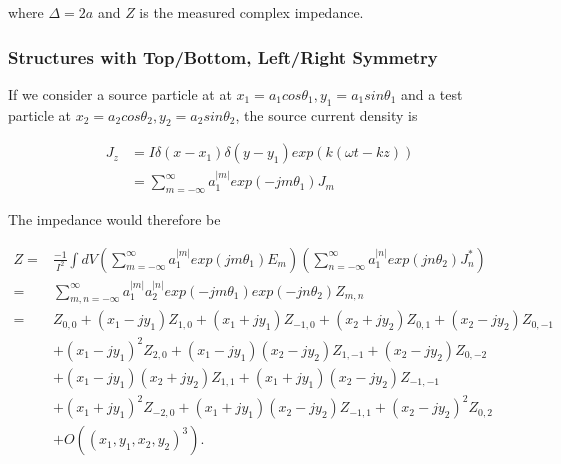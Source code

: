 \documentclass[12pt,a4paper,twopage,openright]{article}
\begin{document}
where $\Delta = 2a$ and $Z$ is the measured complex impedance.

\subsubsection{Structures with Top/Bottom, Left/Right Symmetry}

If we consider a source particle at at $x_{1} = a_{1}cos\theta_{1}, y_{1} = a_{1}sin\theta_{1}$ and a test particle at $x_{2} = a_{2}cos\theta_{2}, y_{2} = a_{2}sin\theta_{2}$, the source current density is

\begin{align}
J_{z} &= I\delta \left( x-x_{1} \right) \delta \left( y-y_{1} \right) exp \left( k \left( \omega t - kz \right) \right) \nonumber \\
          &=\displaystyle\sum\limits_{m=-\infty}^{\infty}a_{1}^{|m|}exp\left( -jm\theta_{1} \right) J_{m}
\end{align}

The impedance would therefore be

\begin{align}
Z = &\frac{-1}{I^{2}} \int dV \left( \displaystyle\sum\limits^{\infty}_{m=-\infty} a_{1}^{|m|} exp \left( jm\theta_{1} \right) E_{m}\right) \left( \displaystyle\sum\limits^{\infty}_{n=-\infty} a_{1}^{|n|} exp \left( jn\theta_{2} \right) J^{*}_{n}\right) \nonumber \\
   = &\displaystyle\sum\limits^{\infty}_{m,n=-\infty} a_{1}^{|m|} a_{2}^{|n|} exp\left( -jm\theta_{1} \right) exp\left( -jn\theta_{2} \right) Z_{m,n} \nonumber \\
   = &Z_{0,0} + \left( x_{1}- jy_{1} \right)Z_{1,0} + \left( x_{1} + jy_{1} \right)Z_{-1,0} + \left( x_{2} + jy_{2} \right)Z_{0,1} +  \left( x_{2} - jy_{2} \right)Z_{0,-1} \nonumber \\
      & +\left( x_{1} - jy_{1} \right)^{2}Z_{2,0} +  \left( x_{1} - jy_{1} \right)\left( x_{2} - jy_{2} \right)Z_{1,-1} + \left( x_{2} - jy_{2} \right) Z_{0,-2} \nonumber \\
      & +\left( x_{1} - jy_{1} \right)\left( x_{2} + jy_{2} \right)Z_{1,1} + \left( x_{1} + jy_{1} \right) \left( x_{2} - jy_{2} \right) Z_{-1,-1} \nonumber \\
      & +\left( x_{1} + jy_{1} \right)^{2}Z_{-2,0} + \left( x_{1} + jy_{1} \right)\left( x_{2} - jy_{2} \right) Z_{-1,1} + \left( x_{2} - jy_{2} \right)^{2}Z_{0,2} \nonumber \\
      & +O\left( \left(  x_{1},y_{1},x_{2},y_{2} \right)^{3} \right).
\label{eqn:gen_imp}
\end{align}
\end{document}
